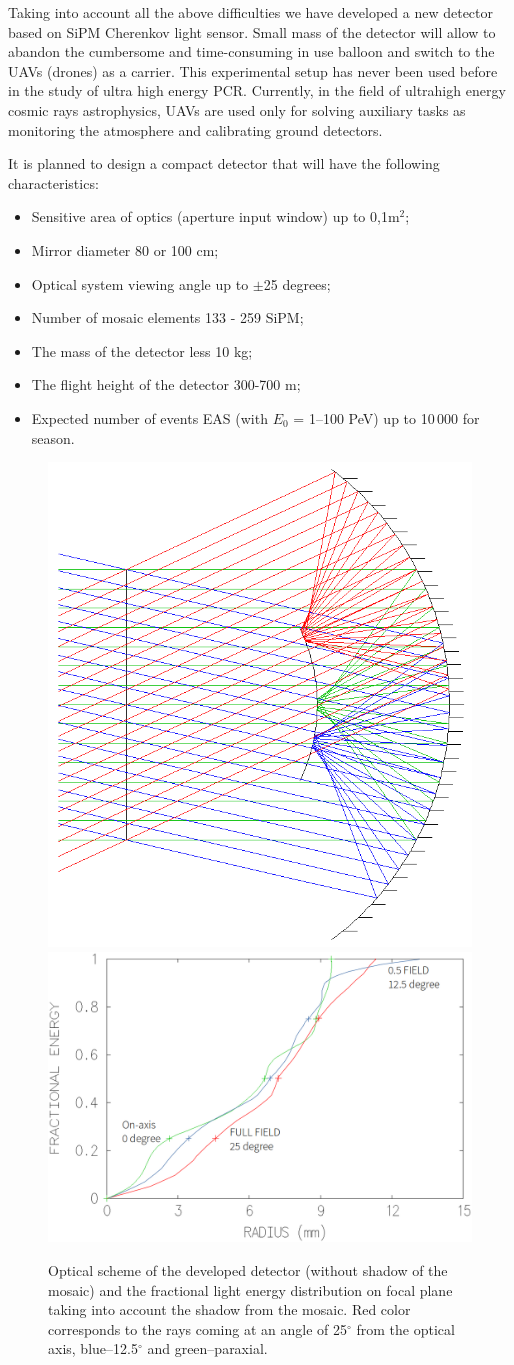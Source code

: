 \documentclass[a4paper,11pt]{article}
\begin{document}
Taking into account all the above difficulties we have developed a new detector based on SiPM Cherenkov light sensor.
Small mass of the detector will allow to abandon the cumbersome and time-consuming in use balloon and switch to the UAVs (drones) as a carrier.
This experimental setup has never been used before in the study of ultra high energy PCR.
Currently, in the field of ultrahigh energy cosmic rays astrophysics, UAVs are used only for solving auxiliary tasks as monitoring the atmosphere and calibrating ground detectors.

It is planned to design a compact detector that will have the following characteristics:

\begin{itemize}
\item Sensitive area of optics (aperture input window) up to 0,1m$^2$;
\item Mirror diameter 80 or 100 cm;
\item Optical system viewing angle up to $\pm$25 degrees;
\item Number of mosaic elements 133 - 259 SiPM;
\item The mass of the detector less 10 kg;
\item The flight height of the detector 300-700 m;
\item Expected number of events EAS (with $E_0$ = 1--100 PeV) up to 10\,000 for season.
\end{itemize}


\begin{figure}[htbp]
\centering %
\includegraphics[width=.32\textwidth,clip]{Sphere3optic.png}
\qquad
\includegraphics[width=.48\textwidth,origin=c,angle=0]{Sphere3spot_energy.png}
\caption{\label{fig:optic_sphere3} Optical scheme of the developed detector (without shadow of the mosaic) and the fractional light energy distribution on focal plane taking into account the shadow from the mosaic. Red color corresponds to the rays coming at an angle of 25$^\circ$ from the optical axis, blue--12.5$^\circ$ and green--paraxial.}
\end{figure}
\end{document}
